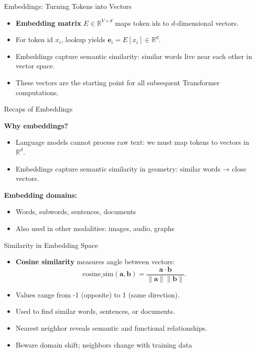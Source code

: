 \documentclass[aspectratio=169]{beamer}
\begin{document}
\begin{frame}{Embeddings: Turning Tokens into Vectors}
  \begin{itemize}
    \item \textbf{Embedding matrix} $E \in \mathbb{R}^{V \times d}$ maps token ids to $d$-dimensional vectors.
    \item For token id $x_i$, lookup yields $\mathbf{e}_i = E[x_i] \in \mathbb{R}^d$.
    \item Embeddings capture semantic similarity: similar words live near each other in vector space.
    \item These vectors are the starting point for all subsequent Transformer computations.
  \end{itemize}
\end{frame}


\begin{frame}{Recaps of Embeddings}

\textbf{Why embeddings?}
\begin{itemize}
    \item Language models cannot process raw text: we must map tokens to vectors in $\mathbb{R}^d$.
    \item Embeddings capture semantic similarity in geometry: similar words → close vectors.
\end{itemize}

\vspace{0.5em}
\textbf{Embedding domains:}
\begin{itemize}
    \item Words, subwords, sentences, documents
    \item Also used in other modalities: images, audio, graphs
\end{itemize}
\end{frame}

\begin{frame}{Similarity in Embedding Space}
  \begin{itemize}
    \item \textbf{Cosine similarity} measures angle between vectors:
      \[
        \text{cosine\_sim}(\mathbf{a}, \mathbf{b}) = \frac{\mathbf{a} \cdot \mathbf{b}}{\|\mathbf{a}\| \|\mathbf{b}\|}.
      \]
    \item Values range from -1 (opposite) to 1 (same direction).
    \item Used to find similar words, sentences, or documents.
    \item Nearest neighhor reveals semantic and functional relationships.
    \item Beware domain shift; neighbors change with training data
  \end{itemize}
\end{frame}
\end{document}
